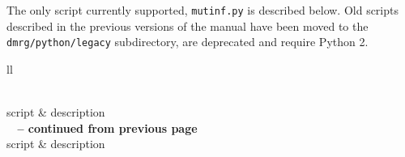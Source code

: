 \documentclass[bibliography=totoc,12pt,a4paper]{scrartcl}
\newcommand{\qcm}{\textsc{QCMaquis}}
\newcommand{\kwd}[1]{\texttt{#1}}
\begin{document}
The only script currently supported, \texttt{mutinf.py} is described below. Old scripts described in the previous versions of the manual have been moved to the\\ \kwd{dmrg/python/legacy} subdirectory, are deprecated and require Python 2.
\begin{longtable}{ll}
  \caption{Overview of \qcm\ \textsc{Python} analysis and visualization scripts.}\\
      \toprule
      {script} & {description} \\
      \midrule
            \endfirsthead
            {{\bfseries \tablename\ \thetable{} -- continued from previous page}} \\
            \toprule
            script & description \\
            \midrule
            \endhead

\end{longtable}
\end{document}
